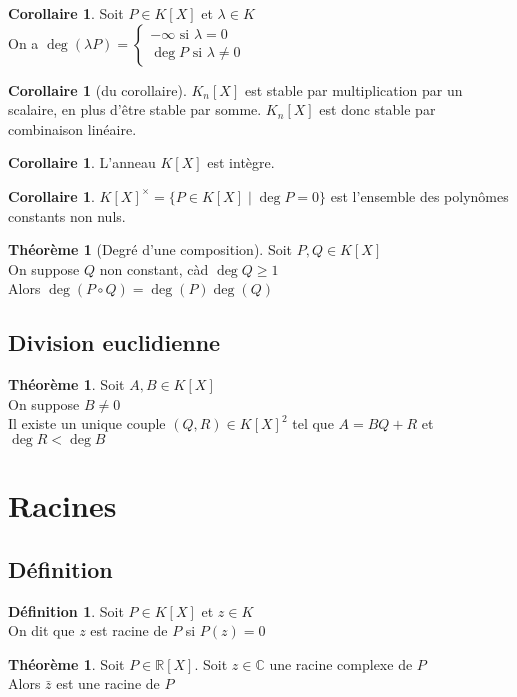 \documentclass[10pt,a4paper]{article}
\theoremstyle{definition}
\newtheorem{theorem}[proposition]{Théorème}
\newtheorem{corollaire}[proposition]{Corollaire}
\newtheorem{definition}[proposition]{Définition}
\begin{document}
\begin{corollaire}
Soit $P \in K[X]$ et $\lambda \in K$ \\
On a $\deg(\lambda P) = \begin{cases}
-\infty	\text{ si } \lambda = 0 \\
\deg P \text{ si } \lambda \neq 0
\end{cases}$
\end{corollaire}
\begin{corollaire}[du corollaire]
$K_n[X]$ est stable par multiplication par un scalaire, en plus d'être stable par somme. $K_n[X]$ est donc stable par combinaison linéaire.
\end{corollaire}
\begin{corollaire}
L'anneau $K[X]$ est intègre.
\end{corollaire}
\begin{corollaire}
$K[X]^\times = \{ P \in K[X] \mid \deg P = 0 \}$ est l'ensemble des polynômes constants non nuls.
\end{corollaire}
\begin{theorem}[Degré d'une composition]
Soit $P, Q \in K[X]$ \\
On suppose $Q$ non constant, càd $\deg Q \geq 1$ \\
Alors $\deg(P \circ Q) = \deg(P) \deg(Q)$
\end{theorem}

\subsection{Division euclidienne}
\begin{theorem}
Soit $A, B \in K[X]$ \\
On suppose $B \neq 0$ \\
Il existe un unique couple $(Q, R) \in K[X]^2$ tel que $A = BQ + R$ et $\deg R < \deg B$
\end{theorem}

\section{Racines}
\subsection{Définition}
\begin{definition}
Soit $P \in K[X]$ et $z \in K$ \\
On dit que $z$ est racine de $P$ si $P(z) = 0$
\end{definition}
\begin{theorem}
Soit $P \in \mathbb{R}[X]$. Soit $z \in \mathbb{C}$ une racine complexe de $P$ \\
Alors $\bar{z}$ est une racine de $P$
\end{theorem}
\end{document}
